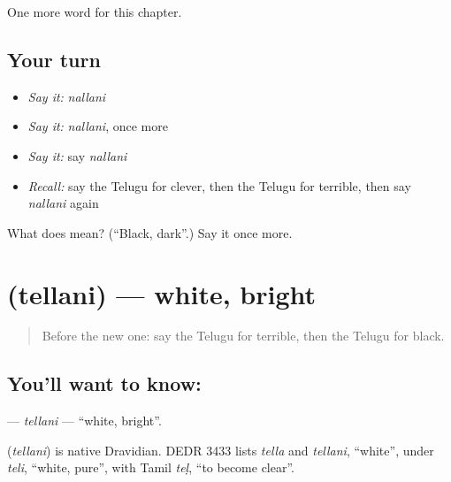 \begin{grammarlens}[title={What you've built}]
One more word for this chapter.
\end{grammarlens}

\subsection*{Your turn}
\begin{itemize}
\raggedright
  \item \emph{Say it:} \emph{nallani}
  \item \emph{Say it:} \emph{nallani}, once more
  \item \emph{Say it:} say \emph{nallani}
  \item \emph{Recall:} say the Telugu for clever, then the Telugu for terrible, then say \emph{nallani} again
\end{itemize}

\begin{tcolorbox}[breakable,colback=teal!4,colframe=teal!35!black,title={Before you move on}]
What does  mean? (\textquotedblleft{}Black, dark\textquotedblright{}.) Say it once more.
\end{tcolorbox}
\section[\texorpdfstring{\te{తెల్లని} (tellani)}{తెల్లని (tellani)}]{ (tellani) — white, bright}

\label{lesson:TE-C142-tellani}



\begin{quote}
Before the new one: say the Telugu for terrible, then the Telugu for black.
\end{quote}

\subsection*{You'll want to know: }
\textbf{} — \emph{tellani} — \textquotedblleft{}white, bright\textquotedblright{}.

\begin{cousinweb}
\textbf{} (\emph{tellani}) is native Dravidian. DEDR 3433 lists \emph{tella} and \emph{tellani}, \textquotedblleft{}white\textquotedblright{}, under \emph{teli}, \textquotedblleft{}white, pure\textquotedblright{}, with Tamil \emph{teḷ}, \textquotedblleft{}to become clear\textquotedblright{}.
\end{cousinweb}

